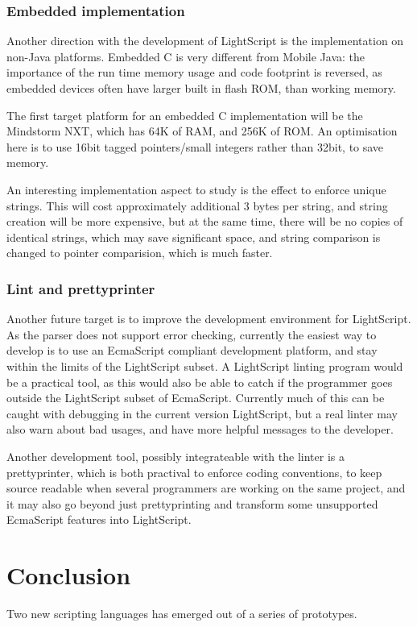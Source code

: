 \documentclass[11pt]{report}
\begin{document}
\subsection{Embedded implementation}

Another direction with the development of LightScript is the implementation on non-Java platforms.
Embedded C is very different from Mobile Java: the importance of the run time memory usage and code footprint is reversed, as embedded devices often have larger built in flash ROM, than working memory.

The first target platform for an embedded C implementation will be the Mindstorm NXT, which has 64K of RAM, and 256K of ROM.
An optimisation here is to use 16bit tagged pointers/small integers rather than 32bit, to save memory. 

An interesting implementation aspect to study is the effect to enforce unique strings. This will cost approximately additional 3 bytes per string, and string creation will be more expensive, but at the same time, there will be no copies of identical strings, which may save significant space, and string comparison is changed to pointer comparision, which is much faster.

\subsection{Lint and prettyprinter}

Another future target is to improve the development environment for LightScript.
As the parser does not support error checking, currently the easiest way to develop is to use an EcmaScript compliant development platform, and stay within the limits of the LightScript subset.
A LightScript linting program would be a practical tool, as this would also be able to catch if the programmer goes outside the LightScript subset of EcmaScript.
Currently much of this can be caught with debugging in the current version LightScript, but a real linter may also warn about bad usages, and have more helpful messages to the developer.

Another development tool, possibly integrateable with the linter is a prettyprinter, which is both practival to enforce coding conventions, to keep source readable when several programmers are working on the same project, and it may also go beyond just prettyprinting and transform some unsupported EcmaScript features into LightScript.

\chapter{Conclusion}
\label{conclusion}
Two new scripting languages has emerged out of a series of prototypes.
\end{document}
